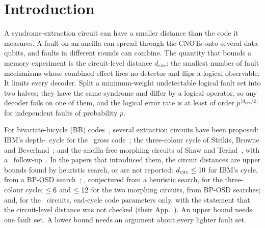 \documentclass[aps,pra,twocolumn,superscriptaddress,nofootinbib,longbibliography,floatfix]{revtex4-2}
\newcommand{\dc}{d_{\mathrm{circ}}}
\begin{document}
\section{Introduction}
\label{sec:intro}

A syndrome-extraction circuit can have a smaller distance than the code it measures. A fault on an ancilla can spread through the CNOTs onto several data qubits, and faults in different rounds can combine. The quantity that bounds a memory experiment is the circuit-level distance $\dc$: the smallest number of fault mechanisms whose combined effect fires no detector and flips a logical observable. It limits every decoder. Split a minimum-weight undetectable logical fault set into two halves; they have the same syndrome and differ by a logical operator, so any decoder fails on one of them, and the logical error rate is at least of order $p^{\lceil \dc/2\rceil}$ for independent faults of probability $p$.

For bivariate-bicycle (BB) codes~\cite{bravyi2024high}, several extraction circuits have been proposed: IBM's depth-\IbmDepth\ cycle for the \GrossCode\ gross code~\cite{bravyi2024high}; the three-colour cycle of Strikis, Browne and Beverland~\cite{strikis2026high}; and the ancilla-free morphing circuits of Shaw and Terhal~\cite{shaw2024lowering}, with a \STbYear\ follow-up~\cite{shaw2026optimising}.
In the papers that introduced them, the circuit distances are upper bounds found by heuristic search, or are not reported: $\dc\le\LitIbmUpper$ for IBM's cycle, from a BP-OSD search~\cite{bravyi2024high,panteleev2021degenerate,roffe2020decoding}; \LitTcConj, conjectured from a heuristic search, for the three-colour cycle; $\le6$ and $\le12$ for the two morphing circuits, from BP-OSD searches; and, for the \STbYear\ circuits, end-cycle code parameters only, with the statement that the circuit-level distance was not checked (their App.~\STbAppendix). An upper bound needs one fault set. A lower bound needs an argument about every lighter fault set.
\end{document}
